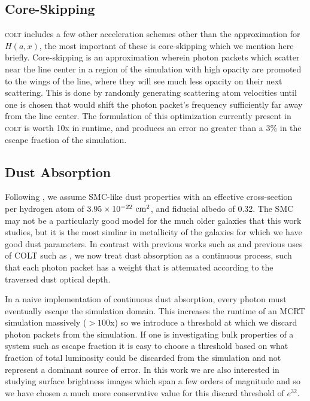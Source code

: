 \subsection{Core-Skipping}
\textsc{colt} includes a few other acceleration schemes other than the approximation for $H(a, x)$, the most important of these is core-skipping which we mention here briefly.
Core-skipping is an approximation wherein photon packets which scatter near the line center in a region of the simulation with high opacity are promoted to the wings of the line, where they will see much less opacity on their next scattering.
This is done by randomly generating scattering atom velocities until one is chosen that would shift the photon packet's frequency sufficiently far away from the line center.
The formulation of this optimization currently present in \textsc{colt} is worth 10x in runtime, and produces an error no greater than a $3\%$ in the escape fraction of the simulation.

\subsection{Dust Absorption}
Following \citet{Laursen2009}, we assume SMC-like dust properties with an effective cross-section per hydrogen atom of $3.95\times10^{-22}\ \rm{cm}^{2}$, and fiducial albedo of 0.32.
The SMC may not be a particularly good model for the much older galaxies that this work studies, but it is the most simliar in metallicity of the galaxies for which we have good dust parameters.
In contrast with previous works such as \citet{Laursen2007} and previous uses of \textsc{COLT} such as \citet{Smith2015}, we now treat dust absorption as a continuous process, such that each photon packet has a weight that is attenuated according to the traversed dust optical depth.

In a naive implementation of continuous dust absorption, every photon must eventually escape the simulation domain.
This increases the runtime of an MCRT simulation massively ($>100$x) so we introduce a threshold at which we discard photon packets from the simulation.
If one is investigating bulk properties of a system such as escape fraction it is easy to choose a threshold based on what fraction of total luminosity could be discarded from the simulation and not represent a dominant source of error.
In this work we are also interested in studying surface brightness images which span a few orders of magnitude and so we have chosen a much more conservative value for this discard threshold of $e^{32}$.

